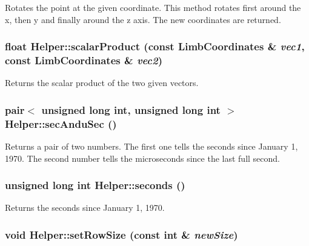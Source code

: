 \label{classHelper_a2255b24c7cf22a501f2edff436294349}
Rotates the point at the given coordinate. This method rotates first around the x, then y and finally around the z axis. The new coordinates are returned. \hypertarget{classHelper_a428aa2b6e98de3265160839b8a9d90dd}{
\subsubsection[{scalarProduct}]{\setlength{\rightskip}{0pt plus 5cm}float Helper::scalarProduct (const {\bf LimbCoordinates} \& {\em vec1}, \/  const {\bf LimbCoordinates} \& {\em vec2})}}
\label{classHelper_a428aa2b6e98de3265160839b8a9d90dd}
Returns the scalar product of the two given vectors. \hypertarget{classHelper_a39ef263c9231d047476673cef6830967}{
\subsubsection[{secAnduSec}]{\setlength{\rightskip}{0pt plus 5cm}pair$<$ unsigned long int, unsigned long int $>$ Helper::secAnduSec ()}}
\label{classHelper_a39ef263c9231d047476673cef6830967}
Returns a pair of two numbers. The first one tells the seconds since January 1, 1970. The second number tells the microseconds since the last full second. \hypertarget{classHelper_a651de62f9290759d729df28b9f1d6c89}{
\subsubsection[{seconds}]{\setlength{\rightskip}{0pt plus 5cm}unsigned long int Helper::seconds ()}}
\label{classHelper_a651de62f9290759d729df28b9f1d6c89}
Returns the seconds since January 1, 1970. \hypertarget{classHelper_af4fcef11ef8f781c90cee2ba176ec521}{
\subsubsection[{setRowSize}]{\setlength{\rightskip}{0pt plus 5cm}void Helper::setRowSize (const int \& {\em newSize})}}
